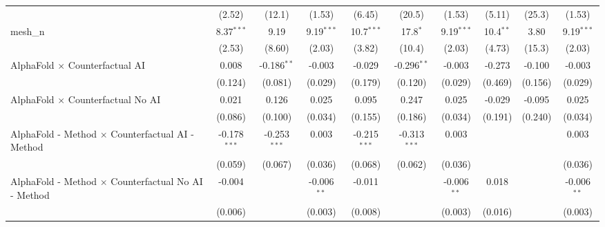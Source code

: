 \begin{tabular}{lccccccccc}
                                                               & (2.52)         & (12.1)         & (1.53)        & (6.45)         & (20.5)         & (1.53)        & (5.11)        & (25.3)        & (1.53)\\   
   mesh\_n                                                     & 8.37$^{***}$   & 9.19           & 9.19$^{***}$  & 10.7$^{***}$   & 17.8$^{*}$     & 9.19$^{***}$  & 10.4$^{**}$   & 3.80          & 9.19$^{***}$\\   
                                                               & (2.53)         & (8.60)         & (2.03)        & (3.82)         & (10.4)         & (2.03)        & (4.73)        & (15.3)        & (2.03)\\   
   AlphaFold $\times$ Counterfactual AI                        & 0.008          & -0.186$^{**}$  & -0.003        & -0.029         & -0.296$^{**}$  & -0.003        & -0.273        & -0.100        & -0.003\\   
                                                               & (0.124)        & (0.081)        & (0.029)       & (0.179)        & (0.120)        & (0.029)       & (0.469)       & (0.156)       & (0.029)\\   
   AlphaFold $\times$ Counterfactual No AI                     & 0.021          & 0.126          & 0.025         & 0.095          & 0.247          & 0.025         & -0.029        & -0.095        & 0.025\\   
                                                               & (0.086)        & (0.100)        & (0.034)       & (0.155)        & (0.186)        & (0.034)       & (0.191)       & (0.240)       & (0.034)\\   
   AlphaFold - Method $\times$ Counterfactual AI - Method      & -0.178$^{***}$ & -0.253$^{***}$ & 0.003         & -0.215$^{***}$ & -0.313$^{***}$ & 0.003         &               &               & 0.003\\   
                                                               & (0.059)        & (0.067)        & (0.036)       & (0.068)        & (0.062)        & (0.036)       &               &               & (0.036)\\   
   AlphaFold - Method $\times$ Counterfactual No AI - Method   & -0.004         &                & -0.006$^{**}$ & -0.011         &                & -0.006$^{**}$ & 0.018         &               & -0.006$^{**}$\\   
                                                               & (0.006)        &                & (0.003)       & (0.008)        &                & (0.003)       & (0.016)       &               & (0.003)\\   

\end{tabular}
